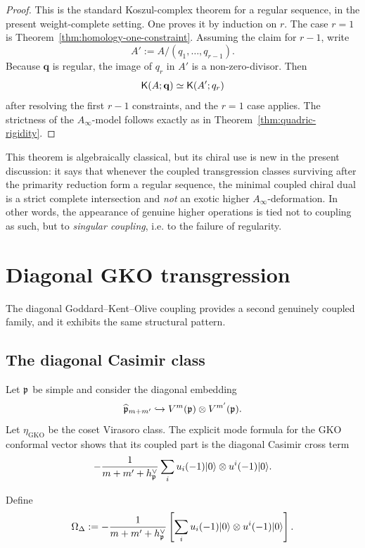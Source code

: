 \begin{proof}
This is the standard Koszul-complex theorem for a regular sequence, in the present weight-complete setting. One proves it by induction on \(r\). The case \(r=1\) is Theorem~\ref{thm:homology-one-constraint}. Assuming the claim for \(r-1\), write
\[
A' := A/(q_1,\dots,q_{r-1}).
\]
Because \(\mathbf q\) is regular, the image of \(q_r\) in \(A'\) is a non-zero-divisor. Then
\[
\mathsf K(A;\mathbf q)\simeq \mathsf K(A';q_r)
\]
after resolving the first \(r-1\) constraints, and the \(r=1\) case applies. The strictness of the \(A_\infty\)-model follows exactly as in Theorem~\ref{thm:quadric-rigidity}.
\end{proof}

\begin{remark}
This theorem is algebraically classical, but its chiral use is new in the present discussion: it says that whenever the coupled transgression classes surviving after the primarity reduction form a regular sequence, the minimal coupled chiral dual is a strict complete intersection and \emph{not} an exotic higher \(A_\infty\)-deformation. In other words, the appearance of genuine higher operations is tied not to coupling as such, but to \emph{singular coupling}, i.e. to the failure of regularity.
\end{remark}

\section{Diagonal GKO transgression}

The diagonal Goddard--Kent--Olive coupling provides a second genuinely coupled family, and it exhibits the same structural pattern.

\subsection{The diagonal Casimir class}

Let \(\mathfrak p\) be simple and consider the diagonal embedding
\[
\widehat{\mathfrak p}_{m+m'}\hookrightarrow V^m(\mathfrak p)\otimes V^{m'}(\mathfrak p).
\]
Let \(\eta_{\mathrm{GKO}}\) be the coset Virasoro class. The explicit mode formula for the GKO conformal vector shows that its coupled part is the diagonal Casimir cross term
\[
-\frac{1}{m+m'+h^\vee_{\mathfrak p}}
\sum_i u_i(-1)\lvert 0\rangle\otimes u^i(-1)\lvert 0\rangle.
\]

Define
\[
\Omega_{\Delta}:=
-\frac{1}{m+m'+h^\vee_{\mathfrak p}}
\left[
\sum_i u_i(-1)\lvert 0\rangle\otimes u^i(-1)\lvert 0\rangle
\right].
\]


